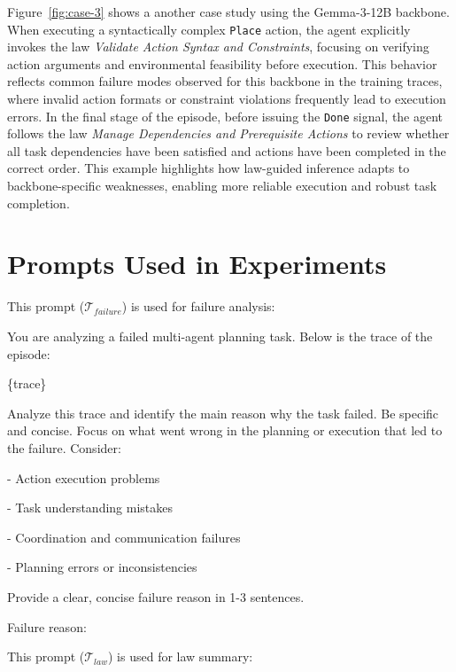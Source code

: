 \documentclass{article}
\theoremstyle{plain}
\theoremstyle{definition}
\theoremstyle{remark}
\begin{document}
Figure~\ref{fig:case-3} shows a another case study using the Gemma-3-12B backbone. When executing a syntactically complex \texttt{Place} action, the agent explicitly invokes the law \textit{Validate Action Syntax and Constraints}, focusing on verifying action arguments and environmental feasibility before execution. This behavior reflects common failure modes observed for this backbone in the training traces, where invalid action formats or constraint violations frequently lead to execution errors. In the final stage of the episode, before issuing the \texttt{Done} signal, the agent follows the law \textit{Manage Dependencies and Prerequisite Actions} to review whether all task dependencies have been satisfied and actions have been completed in the correct order. This example highlights how law-guided inference adapts to backbone-specific weaknesses, enabling more reliable execution and robust task completion.

\clearpage
\section{Prompts Used in Experiments}
\label{sec:appendix-prompts}

This prompt ($\mathcal{T}_{failure}$) is used for failure analysis:

\begin{mdframed}[linewidth=0.8pt, roundcorner=4pt, innerleftmargin=6pt, innerrightmargin=6pt]
You are analyzing a failed multi-agent planning task. Below is the trace of the episode:

\{trace\}

Analyze this trace and identify the main reason why the task failed. Be specific and concise. Focus on what went wrong in the planning or execution that led to the failure. Consider:

- Action execution problems

- Task understanding mistakes

- Coordination and communication failures

- Planning errors or inconsistencies

Provide a clear, concise failure reason in 1-3 sentences.

Failure reason:

\end{mdframed}

This prompt ($\mathcal{T}_{law}$) is used for law summary:
\end{document}
